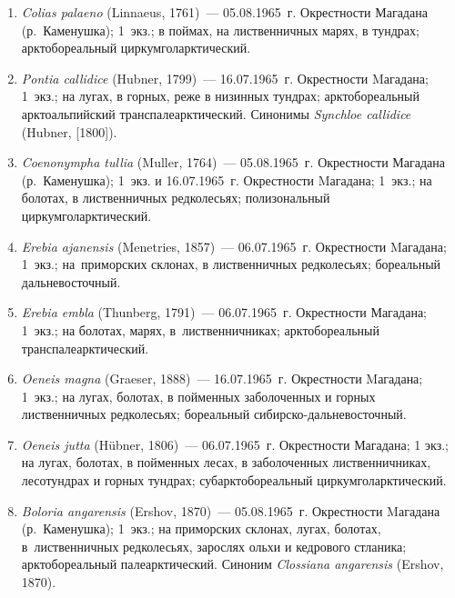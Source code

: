 \begin{enumerate}[noitemsep, leftmargin=0cm]

      \item \textit{Colias palaeno} (Linnaeus, 1761)~--- 05.08.1965~г. Окрестности Магадана (р.~Каменушка); 1~экз.; в поймах, на лиственничных марях, в тундрах; арктобореальный циркумголарктический.

      \item \textit{Pontia callidice} (Hubner, 1799)~--- 16.07.1965~г. Окрестности Mагадана; 1~экз.; на лугах, в горных, реже в низинных тундрах; арктобореальный арктоальпийский транспалеарктический. Синонимы \textit{Synchloe callidice} (Hubner, [1800]).


      \item \textit{Coenonympha tullia} (Muller, 1764)~--- 05.08.1965~г. Окрестности Магадана (р.~Каменушка); 1~экз. и 16.07.1965~г. Окрестности Mагадана; 1~экз.; на болотах, в лиственничных редколесьях; полизональный циркумголарктический.

      \item \textit{Erebia ajanensis} (Menetries, 1857)~--- 06.07.1965~г. Окрестности Mагадана; 1~экз.; на~приморских склонах, в лиственничных редколесьях; бореальный дальневосточный.

      \item  \textit{Erebia embla} (Thunberg, 1791)~--- 06.07.1965~г. Окрестности Магадана; 1~экз.; на болотах, марях, в~лиственничниках; арктобореальный транспалеарктический.

      \item \textit{Oeneis magna} (Graeser, 1888)~--- 16.07.1965~г. Окрестности Mагадана; 1~экз.; на лугах, болотах, в пойменных заболоченных и горных лиственничных редколесьях; бореальный сибирско-дальневосточный.

      \item \textit{Oeneis jutta} (Hübner, 1806)~--- 06.07.1965~г. Окрестности Магадана; 1 экз.; на лугах, болотах, в пойменных лесах, в заболоченных лиственничниках, лесотундрах и горных тундрах; субарктобореальный циркумголарктический.


      \item \textit{Boloria angarensis} (Ershov, 1870)~--- 05.08.1965~г. Окрестности Mагадана (р.~Каменушка); 1~экз.; на приморских склонах, лугах, болотах, в~лиственничных редколесьях, зарослях ольхи и кедрового стланика; арктобореальный палеарктический. Синоним \textit{Clossiana angarensis} (Ershov, 1870).
\end{enumerate}


